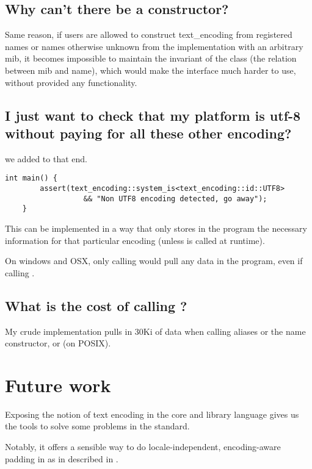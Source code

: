\documentclass{wg21}
\begin{document}
\subsection{Why can't there be a  constructor?}

Same reason, if users are allowed to construct text_encoding from registered names or names otherwise
unknown from the implementation with an arbitrary mib, it becomes impossible to maintain the invariant of the class
(the relation between mib and name), which would make the interface much harder to use, without provided
any functionality.

\subsection{I just want to check that my platform is utf-8 without paying for all these other encoding?}

we added  to that end.

\begin{lstlisting}[style=MY]
    int main() {
        assert(text_encoding::system_is<text_encoding::id::UTF8>
                  && "Non UTF8 encoding detected, go away");
    }
\end{lstlisting}


This can be implemented in a way that only stores in the program the necessary information for that particular encoding (unless  is called at runtime).

On windows and OSX, only calling  would pull any data in the program, even if calling .


\subsection{What is the cost of calling ?}

My crude implementation pulls in 30Ki of data when calling aliases or the name constructor, or  (on POSIX).
\section{Future work}

Exposing the notion of text encoding in the core and library language gives us the tools to solve some
problems in the standard.

Notably, it offers a sensible way to do locale-independent, encoding-aware padding in  as in described in \cite{P1868}.
\end{document}
